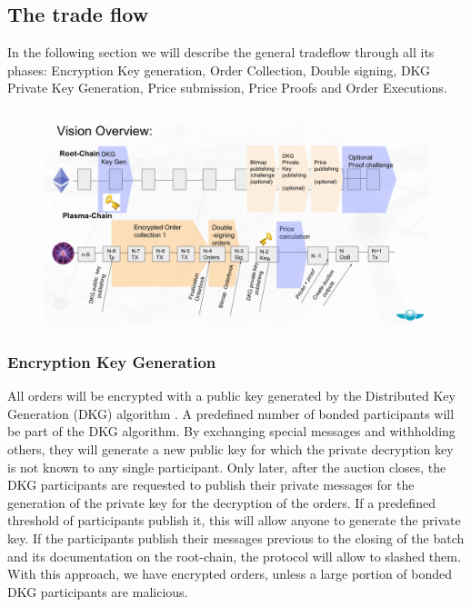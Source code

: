 \documentclass[11pt,parskip=full]{scrartcl}%
\begin{document}
\subsection{The trade flow}
\label{subsec:data}

In the following section we will describe the general tradeflow through all its phases: Encryption Key generation, Order Collection, Double signing, DKG Private Key Generation, Price submission, Price Proofs and Order Executions.

\begin{figure}
\centering
\includegraphics[width=\textwidth]{overview_tradeflow.png}
\end{figure}



\subsubsection{Encryption Key Generation}
All orders will be encrypted with a public key generated by the Distributed Key Generation (DKG) algorithm \cite{DKG}. 
A predefined number of bonded participants will be part of the DKG algorithm. 
By exchanging special messages and withholding others, they will generate a new public key for which the private decryption key is not known to any single participant. 
Only later, after the auction closes, the DKG participants are requested to publish their private messages for the generation of the private key for the decryption of the orders.
If a predefined threshold of participants publish it, this will allow anyone to generate the private key. 
If the participants publish their messages previous to the closing of the batch and its documentation on the root-chain, the protocol will allow to slashed them. 
With this approach, we have encrypted orders, unless a large portion of bonded DKG participants are malicious. 
\end{document}
